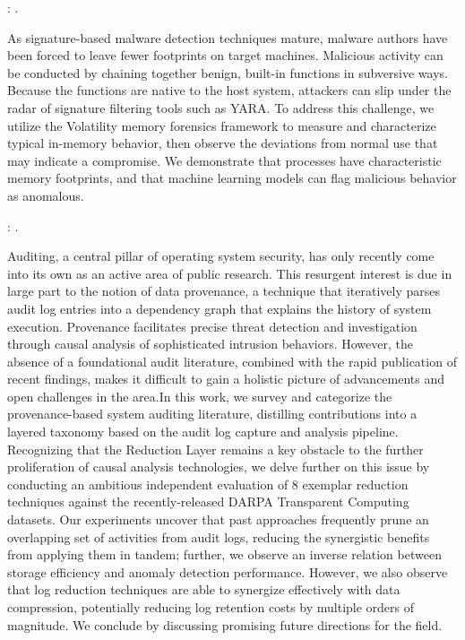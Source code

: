 \documentclass{article}
\begin{document}
\textbf{}: \textcite{Lyles:2022}.

As signature-based malware detection techniques mature, malware authors have been forced to leave fewer footprints on target machines. Malicious activity can be conducted by chaining together benign, built-in functions in subversive ways. Because the functions are native to the host system, attackers can slip under the radar of signature filtering tools such as YARA. To address this challenge, we utilize the Volatility memory forensics framework to measure and characterize typical in-memory behavior, then observe the deviations from normal use that may indicate a compromise. We demonstrate that processes have characteristic memory footprints, and that machine learning models can flag malicious behavior as anomalous.

\textbf{}: \textcite{Inam:2023}.

Auditing, a central pillar of operating system security, has only recently come into its own as an active area of public research. This resurgent interest is due in large part to the notion of data provenance, a technique that iteratively parses audit log entries into a dependency graph that explains the history of system execution. Provenance facilitates precise threat detection and investigation through causal analysis of sophisticated intrusion behaviors. However, the absence of a foundational audit literature, combined with the rapid publication of recent findings, makes it difficult to gain a holistic picture of advancements and open challenges in the area.In this work, we survey and categorize the provenance-based system auditing literature, distilling contributions into a layered taxonomy based on the audit log capture and analysis pipeline. Recognizing that the Reduction Layer remains a key obstacle to the further proliferation of causal analysis technologies, we delve further on this issue by conducting an ambitious independent evaluation of 8 exemplar reduction techniques against the recently-released DARPA Transparent Computing datasets. Our experiments uncover that past approaches frequently prune an overlapping set of activities from audit logs, reducing the synergistic benefits from applying them in tandem; further, we observe an inverse relation between storage efficiency and anomaly detection performance. However, we also observe that log reduction techniques are able to synergize effectively with data compression, potentially reducing log retention costs by multiple orders of magnitude. We conclude by discussing promising future directions for the field.
\end{document}
